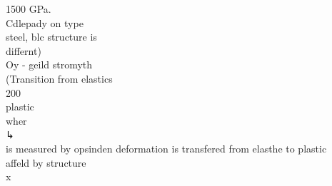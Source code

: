 1500 GPa. \\ Cdlepady on type \\ steel, blc structure is \\ differnt) \\ Oy - geild stromyth \\ (Transition from elastics \\ 200 \\ plastic \\ wher \\ ↳ \\ is measured by opsinden deformation is transfered from elasthe to plastic \\ affeld by structure \\ x
